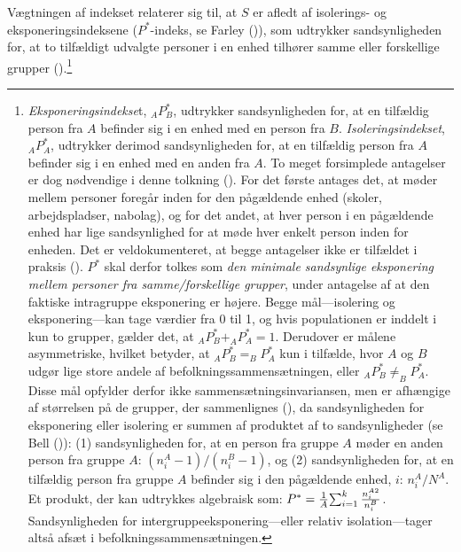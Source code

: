 \documentclass[
]{book}
\begin{document}
Vægtningen af indekset relaterer sig til, at \(S\) er afledt af isolerings- og eksponeringsindeksene (\(P^{*}\)-indeks, se Farley ()), som udtrykker sandsynligheden for, at to tilfældigt udvalgte personer i en enhed tilhører samme eller forskellige grupper ().\footnote{\emph{Eksponeringsindekse}t, \(_{A}P^{*}_{B}\), udtrykker sandsynligheden for, at en tilfældig person fra \(A\) befinder sig i en enhed med en person fra \(B\). \emph{Isoleringsindekset}, \(_{A}P^{*}_{A}\), udtrykker derimod sandsynligheden for, at en tilfældig person fra \(A\) befinder sig i en enhed med en anden fra \(A\). To meget forsimplede antagelser er dog nødvendige i denne tolkning (). For det første antages det, at møder mellem personer foregår inden for den pågældende enhed (skoler, arbejdspladser, nabolag), og for det andet, at hver person i en pågældende enhed har lige sandsynlighed for at møde hver enkelt person inden for enheden. Det er veldokumenteret, at begge antagelser ikke er tilfældet i praksis (). \(P^{*}\) skal derfor tolkes som \emph{den minimale sandsynlige eksponering mellem personer fra samme/forskellige grupper}, under antagelse af at den faktiske intragruppe eksponering er højere. Begge mål---isolering og eksponering---kan tage værdier fra 0 til 1, og hvis populationen er inddelt i kun to grupper, gælder det, at \(_{A}P^{*}_{B} + _{A}P^{*}_{A} = 1\). Derudover er målene asymmetriske, hvilket betyder, at \(_{A}P^{*}_{B} = _{B}P^{*}_{A}\) kun i tilfælde, hvor \(A\) og \(B\) udgør lige store andele af befolkningssammensætningen, eller \(_{A}P^{*}_{B} \neq _{B}P^{*}_{A}\). Disse mål opfylder derfor ikke sammensætningsinvariansen, men er afhængige af størrelsen på de grupper, der sammenlignes (), da sandsynligheden for eksponering eller isolering er summen af produktet af to sandsynligheder (se Bell ()): (1) sandsynligheden for, at en person fra gruppe \(A\) møder en anden person fra gruppe \(A\): \(\left( n_{i}^{A} - 1 \right) / \left( n_{i}^{B} - 1 \right)\), og (2) sandsynligheden for, at en tilfældig person fra gruppe \(A\) befinder sig i den pågældende enhed, \(i\): \(n_{i}^{A} / N^{A}\). Et produkt, der kan udtrykkes algebraisk som: \(P^{*}=\frac{1}{A} {\textstyle \sum_{i=1}^{k}\frac{n_{i}^{A \space 2}}{n_{i}^{B}}}\). Sandsynligheden for intergruppeeksponering---eller relativ isolation---tager altså afsæt i befolkningssammensætningen.}
\end{document}
